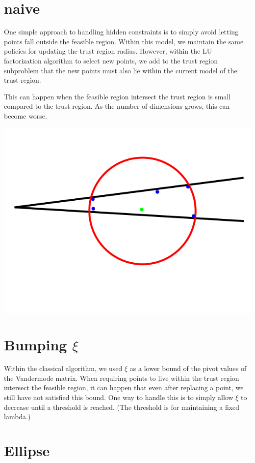 \documentclass{article}
\begin{document}
\section{naive}
One simple approach to handling hidden constraints is to simply avoid letting points fall outside the feasible region.
Within this model, we maintain the same policies for updating the trust region radius.
However, within the LU factorization algorithm to select new points, we add to the trust region subproblem that the new points must also lie within the current model of the trust region.

This can happen when the feasible region intersect the trust region is small compared to the trust region.
As the number of dimensions grows, this can become worse.

\includegraphics[scale=0.2]{bad_lambda.png}

\section{Bumping $\xi$}


Within the classical algorithm, we used $\xi$ as a lower bound of the pivot values of the Vandermode matrix.
When requiring points to live within the trust region intersect the feasible region, it can happen that even after replacing a point, we still have not satisfied this bound.
One way to handle this is to simply allow $\xi$ to decrease until a threshold is reached.
(The threshold is for maintaining a fixed lambda.)


    
\section{Ellipse}
\end{document}
